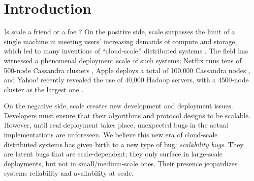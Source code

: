 

\section{Introduction}







Is scale a friend or a foe \cite{Ousterhout+11-ScaleFriendEnemy}?
On the positive side, scale surpasses the limit of a single machine in
meeting users' increasing demands of compute and storage, which led to
many inventions of ``cloud-scale'' distributed systems
\cite{Chang+06-BigTable, 
DeanGhemawat04-MapReduce, 
DeCandia+07-Dynamo,
Ghemawat+03-GoogleFS, 
Hindman+11-Mesos,
Verma+15-Borg}.  The field has witnessed a
phenomenal deployment scale of such systems;
%
Netflix runs tens of 500-node Cassandra clusters \cite{RunningNetflix13},
Apple deploys a total of 100,000 Cassandra nodes \cite{WikiCassandra}, 
and Yahoo! recently revealed the use of 40,000 Hadoop servers,
with a 4500-node cluster as the largest one \cite{LargestHadoop}.



On the negative side, scale creates new development and deployment issues.
Developers must ensure that their algorithms and protocol designs
to be scalable.
However, until real deployment takes place, unexpected bugs 
in the actual implementations are unforeseen.
We believe this new era of cloud-scale distributed systems has given birth
to a new type of bug: {\em scalability bugs}.  They are latent bugs that
are scale-dependent; they only surface in large-scale deployments, but not
in small/medium-scale ones.  Their presence jeopardizes systems
reliability and availability at scale.


